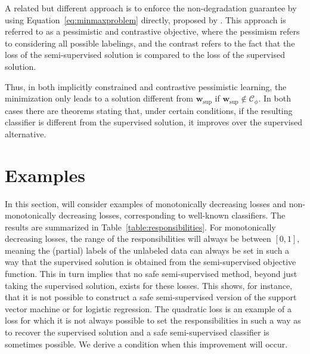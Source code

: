 \documentclass[twoside]{memoir}\usepackage[]{graphicx}\usepackage{xcolor}
\begin{document}
A related but different approach is to enforce the non-degradation guarantee by using Equation~\eqref{eq:minmaxproblem} directly, proposed by \citet{Loog2016}. This approach is referred to as a pessimistic and contrastive objective, where the pessimism refers to considering all possible labelings, and the contrast refers to the fact that the loss of the semi-supervised solution is compared to the loss of the supervised solution.

Thus, in both implicitly constrained and contrastive pessimistic learning, the minimization only leads to a solution different from $\mathbf{w}_\mathrm{sup}$ if $\mathbf{w}_\mathrm{sup} \notin \mathcal{C}_\phi$. In both cases there are theorems stating that, under certain conditions, if the resulting classifier is different from the supervised solution, it improves over the supervised alternative.

\section{Examples} \label{section:Examples}
In this section, will consider examples of monotonically decreasing losses and non-monotonically decreasing losses, corresponding to well-known classifiers. The results are summarized in Table~\ref{table:responsibilities}. For monotonically decreasing losses, the range of the responsibilities will always be between $[0,1]$, meaning the (partial) labels of the unlabeled data can always be set in such a way that the supervised solution is obtained from the semi-supervised objective function. This in turn implies that no safe semi-supervised method, beyond just taking the supervised solution, exists for these losses. This shows, for instance, that it is not possible to construct a safe semi-supervised version of the support vector machine or for logistic regression. The quadratic loss is an example of a loss for which it is not always possible to set the responsibilities in such a way as to recover the supervised solution and a safe semi-supervised classifier is sometimes possible. We derive a condition when this improvement will occur. 
\end{document}
